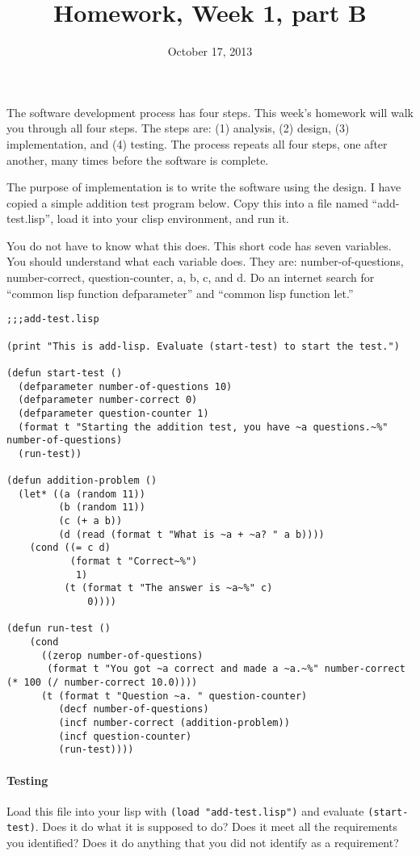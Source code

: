\documentclass{article}
\title{Homework, Week 1, part B}
\date{October 17, 2013}
\begin{document}
\maketitle{}

The software development process has four steps. This week's homework will walk you through all four steps. The steps are: (1) analysis, (2) design, (3) implementation, and (4) testing. The process repeats all four steps, one after another, many times before the software is complete.

The purpose of implementation is to write the software using the design. I have copied a simple addition test program below. Copy this into a file named ``add-test.lisp'', load it into your clisp environment, and run it.

You do not have to know what this does. This short code has seven variables. You should understand what each variable does. They are: number-of-questions, number-correct, question-counter, a, b, c, and d. Do an internet search for ``common lisp function defparameter'' and ``common lisp function let.''

\lstset{language=Lisp,numbers=left,keepspaces=true,basicstyle=\small,numberstyle=\tiny,showstringspaces=false,breaklines=true}
\begin{lstlisting}
;;;add-test.lisp

(print "This is add-lisp. Evaluate (start-test) to start the test.")

(defun start-test ()
  (defparameter number-of-questions 10)
  (defparameter number-correct 0)
  (defparameter question-counter 1)
  (format t "Starting the addition test, you have ~a questions.~%" number-of-questions)
  (run-test))

(defun addition-problem ()
  (let* ((a (random 11))
         (b (random 11))
         (c (+ a b))
         (d (read (format t "What is ~a + ~a? " a b))))
    (cond ((= c d)
           (format t "Correct~%")
            1)
          (t (format t "The answer is ~a~%" c)
              0))))

(defun run-test ()
    (cond 
      ((zerop number-of-questions)
       (format t "You got ~a correct and made a ~a.~%" number-correct (* 100 (/ number-correct 10.0))))
      (t (format t "Question ~a. " question-counter)
         (decf number-of-questions)
         (incf number-correct (addition-problem))
		 (incf question-counter)
         (run-test))))
\end{lstlisting}

\paragraph{Testing}Load this file into your lisp with \texttt{(load "add-test.lisp")} and evaluate \texttt{(start-test)}. Does it do what it is supposed to do? Does it meet all the requirements you identified? Does it do anything that you did not identify as a requirement?
\end{document}
